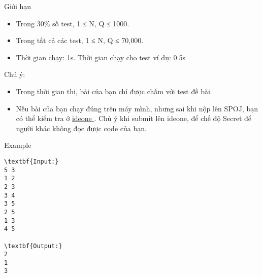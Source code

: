 Giới hạn
\begin{itemize}
	\item     Trong 30\% số test, 1 ≤ N, Q ≤ 1000.   
	\item     Trong tất cả các test, 1 ≤ N, Q ≤ 70,000.   
	\item     Thời gian chạy: 1s. Thời gian chạy cho test ví dụ: 0.5s   
\end{itemize}
Chú ý:
\begin{itemize}
	\item     Trong thời gian thi, bài của bạn chỉ được chấm với test đề bài.   
	\item     Nếu bài của bạn chạy đúng trên máy mình, nhưng sai khi nộp lên SPOJ, bạn có thể kiểm tra ở    \href{https://ideone.com}{     ideone    }    . Chú ý khi submit lên ideone, để chế độ Secret để người khác không đọc được code của bạn.   
\end{itemize}
Example
\begin{verbatim}
\textbf{Input:}
5 3
1 2
2 3
3 4
3 5
2 5
1 3
4 5

\textbf{Output:}
2
1
3
\end{verbatim}